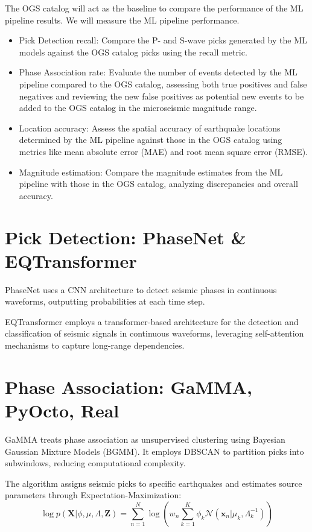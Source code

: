 \documentclass{llncs}
\begin{document}
The OGS catalog will act as the baseline to compare the performance of the 
ML pipeline results. We will measure the ML pipeline performance.
\begin{itemize}
  \item Pick Detection recall: Compare the P- and S-wave picks generated by 
  the ML models against the OGS catalog picks using the recall metric.
  \item Phase Association rate: Evaluate the number of events detected by the 
  ML pipeline compared to the OGS catalog, assessing both true positives and 
  false negatives and reviewing the new false positives as potential new 
  events to be added to the OGS catalog in the microseismic magnitude range.
  \item Location accuracy: Assess the spatial accuracy of earthquake locations 
  determined by the ML pipeline against those in the OGS catalog using metrics 
  like mean absolute error (MAE) and root mean square error (RMSE).
  \item Magnitude estimation: Compare the magnitude estimates from the ML 
  pipeline with those in the OGS catalog, analyzing discrepancies and overall 
  accuracy.
\end{itemize}

\section{Pick Detection: PhaseNet \& EQTransformer}
\label{subsec:PhaseNet}
PhaseNet \cite{PhaseNet} uses a CNN architecture to detect seismic phases in 
continuous waveforms, outputting probabilities at each time step.

EQTransformer \cite{Mousavi2020} employs a transformer-based architecture for 
the detection and classification of seismic signals in continuous waveforms, 
leveraging self-attention mechanisms to capture long-range dependencies.

\section{Phase Association: GaMMA, PyOcto, Real}
\label{subsec:GaMMA}
GaMMA \cite{GaMMA} treats phase association as unsupervised clustering using 
Bayesian Gaussian Mixture Models (BGMM). It employs DBSCAN to 
partition picks into subwindows, reducing computational complexity.

The algorithm assigns seismic picks to specific earthquakes and estimates 
source parameters through Expectation-Maximization:
\begin{equation}
  \log p(\mathbf{X}|\phi,\mu,\Lambda,\mathbf{Z}) = \sum_{n=1}^{N}\log\left(
  w_n\sum_{k=1}^{K}\phi_k\mathcal{N}(\mathbf{x}_n|\mu_k,\Lambda_k^{-1})\right)
  \label{eq:GaMMA}
\end{equation}
\end{document}

